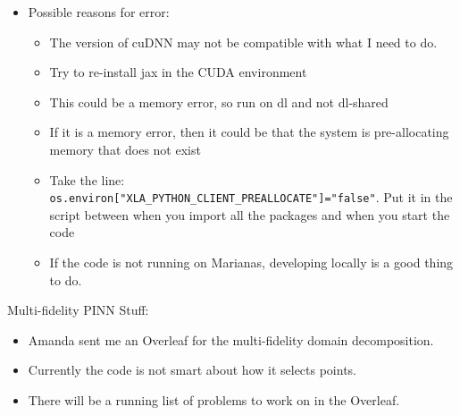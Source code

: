 \documentclass{article}
\begin{document}
\begin{itemize}
\item Possible reasons for error:
\begin{itemize}
\item The version of cuDNN may not be compatible with what I need to do.
\item Try to re-install jax in the CUDA environment
\item This could be a memory error, so run on dl and not dl-shared
\item If it is a memory error, then it could be that the system is pre-allocating memory that does not exist
\item Take the line: \verb|os.environ["XLA_PYTHON_CLIENT_PREALLOCATE"]="false"|. Put it in the script between when you import all the packages and when you start the code
\item If the code is not running on Marianas, developing locally is a good thing to do. 
\end{itemize}
\end{itemize}
Multi-fidelity PINN Stuff:
\begin{itemize}
\item Amanda sent me an Overleaf for the multi-fidelity domain decomposition.
\item Currently the code is not smart about how it selects points.
\item There will be a running list of problems to work on in the Overleaf.

\end{itemize}
\end{document}
